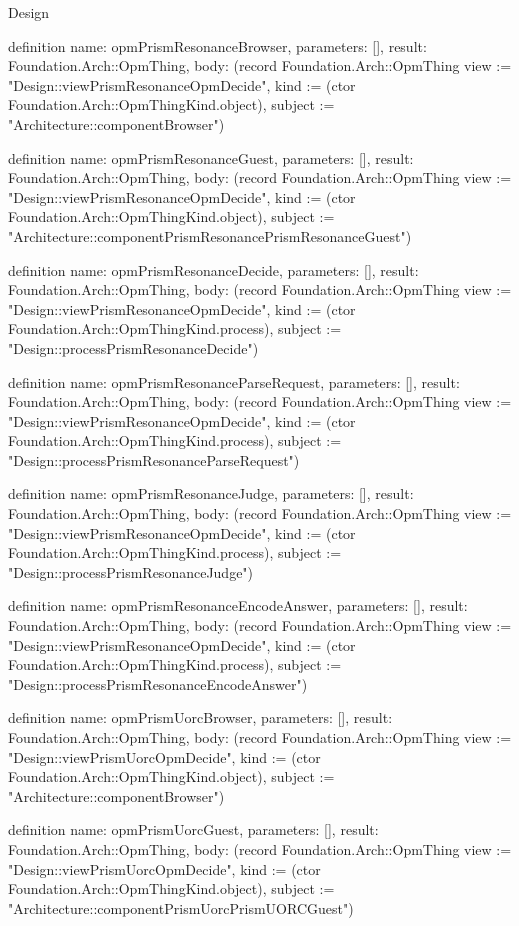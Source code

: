 \begin{lexlean}{Design}
\begin{semanticmodule}
definition{
  name: opmPrismResonanceBrowser,
  parameters: [],
  result: Foundation.Arch::OpmThing,
  body: (record Foundation.Arch::OpmThing {view := "Design::viewPrismResonanceOpmDecide", kind := (ctor Foundation.Arch::OpmThingKind.object), subject := "Architecture::componentBrowser"})
}

definition{
  name: opmPrismResonanceGuest,
  parameters: [],
  result: Foundation.Arch::OpmThing,
  body: (record Foundation.Arch::OpmThing {view := "Design::viewPrismResonanceOpmDecide", kind := (ctor Foundation.Arch::OpmThingKind.object), subject := "Architecture::componentPrismResonancePrismResonanceGuest"})
}

definition{
  name: opmPrismResonanceDecide,
  parameters: [],
  result: Foundation.Arch::OpmThing,
  body: (record Foundation.Arch::OpmThing {view := "Design::viewPrismResonanceOpmDecide", kind := (ctor Foundation.Arch::OpmThingKind.process), subject := "Design::processPrismResonanceDecide"})
}

definition{
  name: opmPrismResonanceParseRequest,
  parameters: [],
  result: Foundation.Arch::OpmThing,
  body: (record Foundation.Arch::OpmThing {view := "Design::viewPrismResonanceOpmDecide", kind := (ctor Foundation.Arch::OpmThingKind.process), subject := "Design::processPrismResonanceParseRequest"})
}

definition{
  name: opmPrismResonanceJudge,
  parameters: [],
  result: Foundation.Arch::OpmThing,
  body: (record Foundation.Arch::OpmThing {view := "Design::viewPrismResonanceOpmDecide", kind := (ctor Foundation.Arch::OpmThingKind.process), subject := "Design::processPrismResonanceJudge"})
}

definition{
  name: opmPrismResonanceEncodeAnswer,
  parameters: [],
  result: Foundation.Arch::OpmThing,
  body: (record Foundation.Arch::OpmThing {view := "Design::viewPrismResonanceOpmDecide", kind := (ctor Foundation.Arch::OpmThingKind.process), subject := "Design::processPrismResonanceEncodeAnswer"})
}

definition{
  name: opmPrismUorcBrowser,
  parameters: [],
  result: Foundation.Arch::OpmThing,
  body: (record Foundation.Arch::OpmThing {view := "Design::viewPrismUorcOpmDecide", kind := (ctor Foundation.Arch::OpmThingKind.object), subject := "Architecture::componentBrowser"})
}

definition{
  name: opmPrismUorcGuest,
  parameters: [],
  result: Foundation.Arch::OpmThing,
  body: (record Foundation.Arch::OpmThing {view := "Design::viewPrismUorcOpmDecide", kind := (ctor Foundation.Arch::OpmThingKind.object), subject := "Architecture::componentPrismUorcPrismUORCGuest"})
}


\end{semanticmodule}
\end{lexlean}
